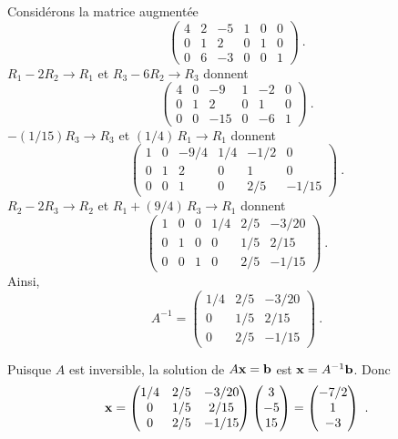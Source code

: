 { Considérons la matrice augmentée
\[
\left(\begin{array}{ccc|ccc}
4 & 2 & -5 & 1 & 0 & 0 \\ 0 & 1 & 2 & 0 & 1 & 0 \\ 0 & 6 & -3 & 0 & 0
& 1 \end{array}\right) \ .
\]
$R_1-2R_2 \rightarrow R_1$ et $R_3-6R_2\rightarrow R_3$ donnent
\[
\left(\begin{array}{ccc|ccc}
4 & 0 & -9 & 1 & -2 & 0 \\ 0 & 1 & 2 & 0 & 1 & 0 \\ 0 & 0 & -15 & 0 &
-6 & 1 \end{array}\right) \ .
\]
$-(1/15)R_3 \rightarrow R_3$ et $(1/4)\,R_1\rightarrow R_1$ donnent
\[
\left(\begin{array}{ccc|ccc}
1 & 0 & -9/4 & 1/4 & -1/2 & 0 \\ 0 & 1 & 2 & 0 & 1 & 0 \\ 0 & 0 & 1 & 0 & 2/5
& -1/15 \end{array}\right) \ .
\]
$R_2-2R_3\rightarrow R_2$ et $R_1 +(9/4)\,R_3 \rightarrow R_1$ donnent
\[
\left(\begin{array}{ccc|ccc}
1 & 0 & 0 & 1/4 & 2/5 & -3/20 \\ 0 & 1 & 0 & 0 & 1/5 & 2/15
\\ 0 & 0 & 1 & 0 & 2/5 & -1/15 \end{array}\right) \ .
\]
Ainsi,
\[
A^{-1} =
\begin{pmatrix}
1/4 & 2/5 & -3/20 \\ 0 & 1/5 & 2/15 \\ 0 & 2/5 & -1/15
\end{pmatrix} \ .
\]

 Puisque $A$ est inversible, la solution de $A\mathbf{x} = \mathbf{b}$
est $\mathbf{x} = A^{-1}\mathbf{b}$.  Donc
\[
\mathbf{x} = 
\begin{pmatrix}
1/4 & 2/5 & -3/20 \\ 0 & 1/5 & 2/15 \\ 0 & 2/5 & -1/15
\end{pmatrix}
\begin{pmatrix} 3 \\ -5 \\ 15 \end{pmatrix}
= \begin{pmatrix} -7/2 \\ 1 \\ -3 \end{pmatrix} \ .
\]

}
